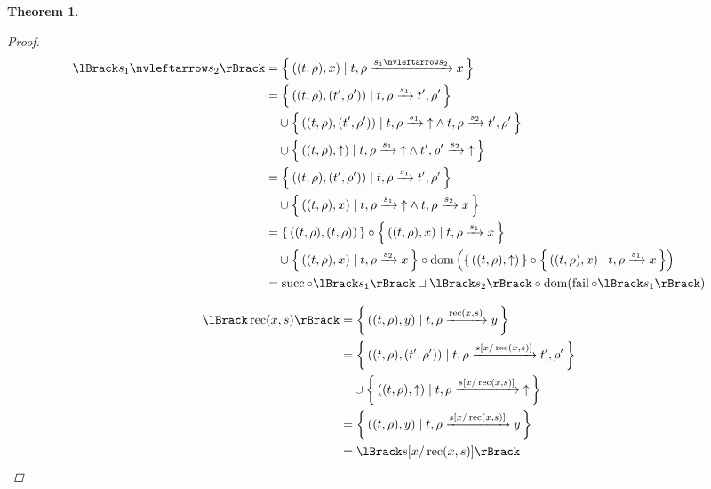 \documentclass{article}
\newtheorem{theorem}{Theorem}
\newcommand{\fail}{\ensuremath \text{$\uparrow$}}
\newcommand{\leftchoice}[2]{\ensuremath #1 \nvleftarrow #2}
\newcommand{\fix}[2]{\ensuremath \operatorname{rec}(#1,#2)}
\newcommand{\subst}[3]{\ensuremath #1[#2 / #3]}
\newcommand{\transform}[5]{#1, #2 \xrightarrow{#3} #4, #5}
\newcommand{\transformx}[4]{#1, #2 \xrightarrow{#3} #4}
\newcommand{\transformfail}[3]{#1, #2 \xrightarrow{#3} \fail}
\newcommand{\sem}[1]{\ensuremath \lBrack #1 \rBrack}
\newcommand{\setbuild}[2]{\ensuremath \left\{\, #1 \mid #2 \,\right\}}
\newcommand{\setbuildc}[1]{\ensuremath \left\{\, #1 \,\right\}}
\newcommand{\domain}{\ensuremath \operatorname{dom}}
\newcommand{\lfail}{\ensuremath \operatorname{fail}}
\newcommand{\lsucc}{\ensuremath \operatorname{succ}}
\begin{document}
\begin{theorem}
\begin{proof}
\begin{align*}
  \sem{\leftchoice{s_1}{s_2}}
     &= {\setbuild{((t,\rho),x)}{\transformx{t}{\rho}{\leftchoice{s_1}{s_2}}{x}}} \\
     &= {\setbuild{((t,\rho),(t',\rho'))}{\transform{t}{\rho}{s_1}{t'}{\rho'}}} \\
     &\quad \cup {\setbuild{((t,\rho),(t',\rho'))}{\transformfail{t}{\rho}{s_1} \land \transform{t}{\rho}{s_2}{t'}{\rho'}}} \\
     &\quad \cup {\setbuild{((t,\rho),\fail)}{\transformfail{t}{\rho}{s_1} \land \transformfail{t'}{\rho'}{s_2}}} \\
     &= {\setbuild{((t,\rho),(t',\rho'))}{\transform{t}{\rho}{s_1}{t'}{\rho'}}} \\
     &\quad \cup {\setbuild{((t,\rho),x)}{\transformfail{t}{\rho}{s_1} \land \transformx{t}{\rho}{s_2}{x}}} \\
     &= {\setbuildc{((t,\rho),(t,\rho))}} \circ {\setbuild{((t,\rho),x)}{\transformx{t}{\rho}{s_1}{x}}} \\
     & \quad \cup {\setbuild{((t,\rho),x)}{\transformx{t}{\rho}{s_2}{x}}} \circ \domain \left({\setbuildc{((t,\rho),\fail)}} \circ {\setbuild{((t,\rho),x)}{\transformx{t}{\rho}{s_1}{x}}}\right) \\
     &= \lsucc \circ \sem{s_1} \sqcup \sem{s_2} \circ \domain (\lfail \circ \sem{s_1})
\end{align*}

\begin{align*}
  \sem{\fix{x}{s}}
    &= {\setbuild{((t,\rho),y)}{\transformx{t}{\rho}{\fix{x}{s}}{y}}} \\
    &= {\setbuild{((t,\rho),(t',\rho'))}{\transform{t}{\rho}{\subst{s}{x}{\fix{x}{s}}}{t'}{\rho'}}} \\
    &\quad \cup {\setbuild{((t,\rho),\fail)}{\transformfail{t}{\rho}{\subst{s}{x}{\fix{x}{s}}}}} \\
    &= {\setbuild{((t,\rho),y)}{\transformx{t}{\rho}{\subst{s}{x}{\fix{x}{s}}}{y}}} \\
    &= \sem{\subst{s}{x}{\fix{x}{s}}}
\end{align*}


\end{proof}
\end{theorem}
\end{document}

